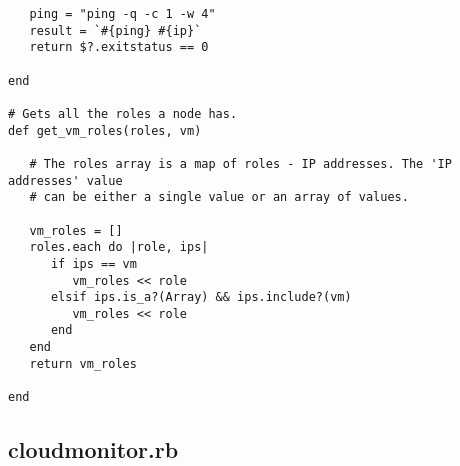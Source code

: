 \begin{lstlisting}
   ping = "ping -q -c 1 -w 4"
   result = `#{ping} #{ip}`
   return $?.exitstatus == 0

end

# Gets all the roles a node has.
def get_vm_roles(roles, vm)

   # The roles array is a map of roles - IP addresses. The 'IP addresses' value
   # can be either a single value or an array of values.
   
   vm_roles = []
   roles.each do |role, ips|
      if ips == vm
         vm_roles << role
      elsif ips.is_a?(Array) && ips.include?(vm)
         vm_roles << role
      end
   end
   return vm_roles

end
\end{lstlisting}


\subsection{cloudmonitor.rb}


